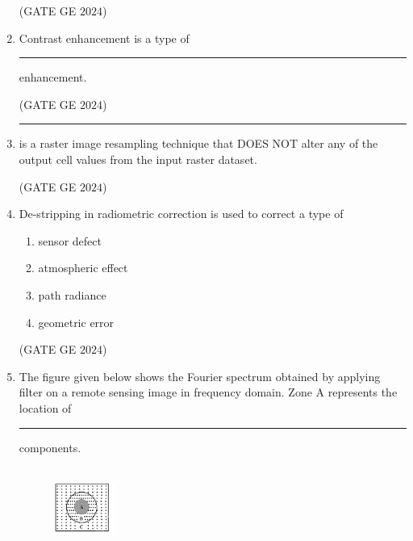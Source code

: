 \documentclass[journal,12pt,onecolumn]{IEEEtran}
\theoremstyle{remark}
\begin{document}
\begin{enumerate}
\begin{enumerate}
\end{enumerate}
\hfill{(GATE GE $2024$)}
\bigskip
\item Contrast enhancement is a type of \rule{2cm}{0.5mm} enhancement.
\begin{enumerate}
\end{enumerate}
\hfill{(GATE GE $2024$)}
\bigskip
\item \rule{2cm}{0.5mm} is a raster image resampling technique that DOES NOT alter any of the output cell values from the input raster dataset.
\begin{enumerate}
\end{enumerate}
\hfill{(GATE GE $2024$)}
\bigskip
\item De-stripping in radiometric correction is used to correct a type of
\begin{enumerate}
\item sensor defect
\item atmospheric effect
\item path radiance
\item geometric error
\end{enumerate}
\hfill{(GATE GE $2024$)}
\bigskip
\item The figure given below shows the Fourier spectrum obtained by applying filter on a remote sensing image in frequency domain.
Zone A represents the location of \rule{2cm}{0.5mm} components. \\
\\
\begin{figure}[h!]
    \centering
    \includegraphics[width=0.2\textwidth]{figs/fig10.png}
\end{figure}


\end{enumerate}
\end{document}
